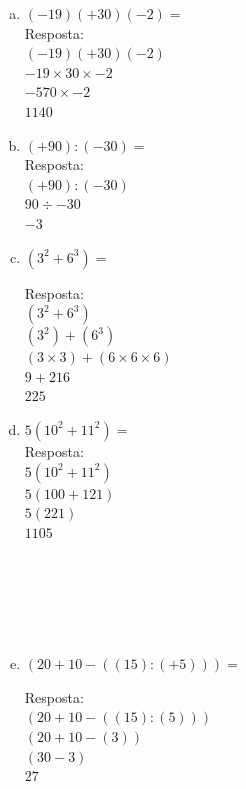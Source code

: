 \documentclass[a4paper,14pt]{article}
\begin{document}
\begin{multicols}{2}
\begin{enumerate}
\begin{enumerate}[a)]
				\item $(-19)(+30)(-2) = $ \\
				
				Resposta: \\
				
				$(-19)(+30)(-2)$ \\
				$-19 \times 30 \times -2$ \\
				$-570 \times -2$ \\
				$1140$ \\
				
				\item $(+90):(-30) = $ \\
				
				Resposta: \\ 
				
				$(+90):(-30)$ \\
				$90 \div -30$ \\
				$-3$ \\
				
				\item $(3^2 + 6^3) = $
				
				Resposta: \\
				
				$(3^2 + 6^3)$ \\ 
				$(3^2) + (6^3)$ \\
				$(3 \times 3) + (6 \times 6 \times 6)$ \\
				$9 + 216$ \\
				$225$ \\
				
				\item $5(10^2 + 11^2) = $ \\
				
				Resposta: \\
				
				$5(10^2 + 11^2)$ \\
				$5(100 + 121)$ \\
				$5(221)$ \\
				$1105$ \\\\\\\\\\\\
				
				\item $(20 + 10 -((15):(+5))) = $
				
				Resposta: \\
				
				$(20 + 10 -((15):(5)))$ \\
				$(20 + 10 -(3))$ \\
				$(30 - 3)$ \\
				$27$ \\\\\\
				

\end{enumerate}
\end{enumerate}
\end{multicols}
\end{document}
